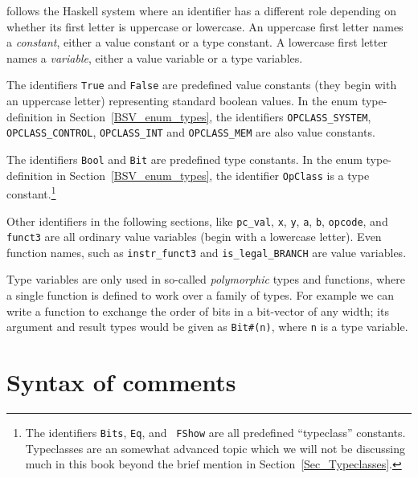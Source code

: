 {\BSV} follows the Haskell system where an identifier has a different
role depending on whether its first letter is uppercase or lowercase.
An uppercase first letter names a \emph{constant}, either a value
constant or a type constant.  A lowercase first letter names a
\emph{variable}, either a value variable or a type variables.


The identifiers \verb|True| and \verb|False| are predefined value
constants (they begin with an uppercase letter) representing standard
boolean values.  In the enum type-definition in
Section~\ref{BSV_enum_types}, the identifiers \verb|OPCLASS_SYSTEM|,
\verb|OPCLASS_CONTROL|, \verb|OPCLASS_INT| and \verb|OPCLASS_MEM| are
also value constants.

The identifiers \verb|Bool| and \verb|Bit| are predefined type
constants.  In the enum type-definition in
Section~\ref{BSV_enum_types}, the identifier \verb|OpClass| is a type
constant.\footnote{The identifiers {\tt Bits}, {\tt Eq}, and {\tt
FShow} are all predefined ``typeclass'' constants.  Typeclasses are an
somewhat advanced topic which we will not be discussing much in this
book beyond the brief mention in Section~\ref{Sec_Typeclasses}.  }

Other identifiers in the following sections, like \verb|pc_val|,
\verb|x|, \verb|y|, \verb|a|, \verb|b|, \verb|opcode|, and
\verb|funct3| are all ordinary value variables (begin with a lowercase
letter).  Even function names, such as \verb|instr_funct3| and
\verb|is_legal_BRANCH| are value variables.

Type variables are only used in so-called \emph{polymorphic} types and
functions, where a single function is defined to work over a family of
types.  For example we can write a function to exchange the order of
bits in a bit-vector of any width; its argument and result types would
be given as \verb|Bit#(n)|, where \verb|n| is a type variable.


\section{Syntax of comments}

\label{BSV_Syntax_of_comments}


